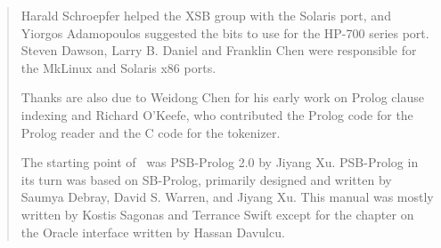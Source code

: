 \begin{quote}
Harald Schroepfer helped the XSB group with the Solaris port, and
Yiorgos Adamopoulos suggested the bits to use for the HP-700 series
port.  Steven Dawson, Larry B. Daniel and Franklin Chen were
responsible for the MkLinux and Solaris x86 ports.

Thanks are also due to Weidong Chen for his early work on Prolog
clause indexing and Richard O'Keefe, who contributed the Prolog
code for the Prolog reader and the C code for the tokenizer.  

The starting point of \ourprolog\ was PSB-Prolog 2.0 by Jiyang Xu.
PSB-Prolog in its turn was based on SB-Prolog, primarily designed and
written by Saumya Debray, David S. Warren, and Jiyang Xu.  This manual
was mostly written by Kostis Sagonas and Terrance Swift except for the
chapter on the Oracle interface written by Hassan Davulcu.

\end{quote}

